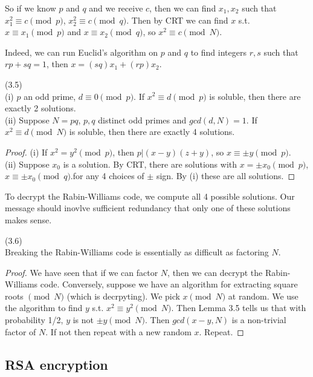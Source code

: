 \documentclass[a4paper]{article}
\begin{document}
So if we know $p$ and $q$ and we receive $c$, then we can find $x_1,x_2$ such that $x_1^2 \equiv c \pmod p$, $x_2^2 \equiv c \pmod q$. Then by CRT we can find $x$ s.t. $x \equiv x_1 \pmod p$ and $x \equiv x_2 \pmod q$, so $x^2 \equiv c \pmod N$.

Indeed, we can run Euclid's algorithm on $p$ and $q$ to find integers $r,s$ such that $rp+sq = 1$, then $x=(sq)x_1+(rp)x_2$.

\begin{lemma} (3.5)\\
(i) $p$ an odd prime, $d \equiv 0 \pmod p$. If $x^2 \equiv d \pmod p$ is soluble, then there are exactly 2 solutions.\\
(ii) Suppose $N = pq$, $p,q$ distinct odd primes and $gcd(d,N) = 1$. If $x^2 \equiv d \pmod N$ is soluble, then there are exactly 4 solutions.
\begin{proof}
(i) If $x^2 = y^2 \pmod p$, then $p|(x-y)(z+y)$, so $x \equiv \pm y \pmod p$.\\
(ii) Suppose $x_0$ is a solution. By CRT, there are solutions with $x=\pm x_0 \pmod p$, $x \equiv \pm x_0 \pmod q$.for any 4 choices of $\pm$ sign. By (i) these are all solutions.
\end{proof}
\end{lemma}

To decrypt the Rabin-Williams code, we compute all 4 possible solutions. Our message should inovlve sufficient redundancy that only one of these solutions makes sense.

\begin{thm} (3.6)\\
Breaking the Rabin-Williams code is essentially as difficult as factoring $N$.
\begin{proof}
We have seen that if we can factor $N$, then we can decrypt the Rabin-Williams code. Conversely, suppose we have an algorithm for extracting square roots $\pmod N$ (which is decrpyting). We pick $x \pmod N$ at random. We use the algorithm to find $y$ s.t. $x^2 \equiv y^2 \pmod N$. Then Lemma 3.5 tells us that with probability 1/2, $y$ is not $\pm y \pmod N$. Then $gcd(x-y,N)$ is a non-trivial factor of $N$. If not then repeat with a new random $x$. Repeat.
\end{proof}
\end{thm}

\subsection{RSA encryption}
\end{document}
